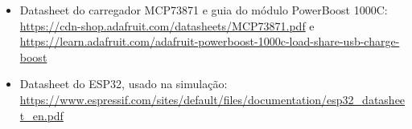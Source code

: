 \begin{itemize}
    \item \label{anexo:datasheet-carregador} Datasheet do carregador
    MCP73871 e guia do módulo PowerBoost 1000C:
    \url{https://cdn-shop.adafruit.com/datasheets/MCP73871.pdf} e
    \url{https://learn.adafruit.com/adafruit-powerboost-1000c-load-share-usb-charge-boost}

    \item \label{anexo:datasheet-esp32} Datasheet do ESP32, usado na
    simulação:
    \url{https://www.espressif.com/sites/default/files/documentation/esp32_datasheet_en.pdf}

\end{itemize}